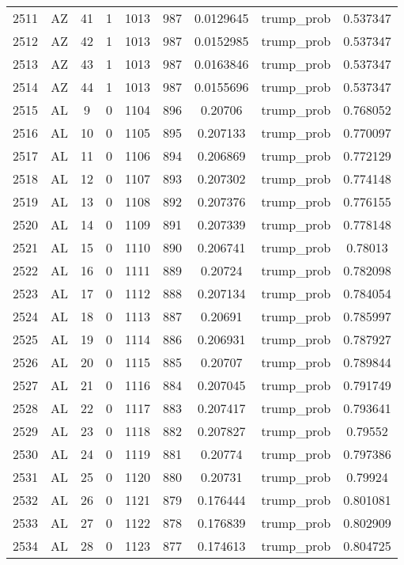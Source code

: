 \documentclass[12pt,a4paper]{article}
\begin{document}
\begin{tabular}{r|cccccccc}
	2511 & AZ & 41 & 1 & 1013 & 987 & 0.0129645 & trump\_prob & 0.537347 \\
	2512 & AZ & 42 & 1 & 1013 & 987 & 0.0152985 & trump\_prob & 0.537347 \\
	2513 & AZ & 43 & 1 & 1013 & 987 & 0.0163846 & trump\_prob & 0.537347 \\
	2514 & AZ & 44 & 1 & 1013 & 987 & 0.0155696 & trump\_prob & 0.537347 \\
	2515 & AL & 9 & 0 & 1104 & 896 & 0.20706 & trump\_prob & 0.768052 \\
	2516 & AL & 10 & 0 & 1105 & 895 & 0.207133 & trump\_prob & 0.770097 \\
	2517 & AL & 11 & 0 & 1106 & 894 & 0.206869 & trump\_prob & 0.772129 \\
	2518 & AL & 12 & 0 & 1107 & 893 & 0.207302 & trump\_prob & 0.774148 \\
	2519 & AL & 13 & 0 & 1108 & 892 & 0.207376 & trump\_prob & 0.776155 \\
	2520 & AL & 14 & 0 & 1109 & 891 & 0.207339 & trump\_prob & 0.778148 \\
	2521 & AL & 15 & 0 & 1110 & 890 & 0.206741 & trump\_prob & 0.78013 \\
	2522 & AL & 16 & 0 & 1111 & 889 & 0.20724 & trump\_prob & 0.782098 \\
	2523 & AL & 17 & 0 & 1112 & 888 & 0.207134 & trump\_prob & 0.784054 \\
	2524 & AL & 18 & 0 & 1113 & 887 & 0.20691 & trump\_prob & 0.785997 \\
	2525 & AL & 19 & 0 & 1114 & 886 & 0.206931 & trump\_prob & 0.787927 \\
	2526 & AL & 20 & 0 & 1115 & 885 & 0.20707 & trump\_prob & 0.789844 \\
	2527 & AL & 21 & 0 & 1116 & 884 & 0.207045 & trump\_prob & 0.791749 \\
	2528 & AL & 22 & 0 & 1117 & 883 & 0.207417 & trump\_prob & 0.793641 \\
	2529 & AL & 23 & 0 & 1118 & 882 & 0.207827 & trump\_prob & 0.79552 \\
	2530 & AL & 24 & 0 & 1119 & 881 & 0.20774 & trump\_prob & 0.797386 \\
	2531 & AL & 25 & 0 & 1120 & 880 & 0.20731 & trump\_prob & 0.79924 \\
	2532 & AL & 26 & 0 & 1121 & 879 & 0.176444 & trump\_prob & 0.801081 \\
	2533 & AL & 27 & 0 & 1122 & 878 & 0.176839 & trump\_prob & 0.802909 \\
	2534 & AL & 28 & 0 & 1123 & 877 & 0.174613 & trump\_prob & 0.804725 \\

\end{tabular}
\end{document}
